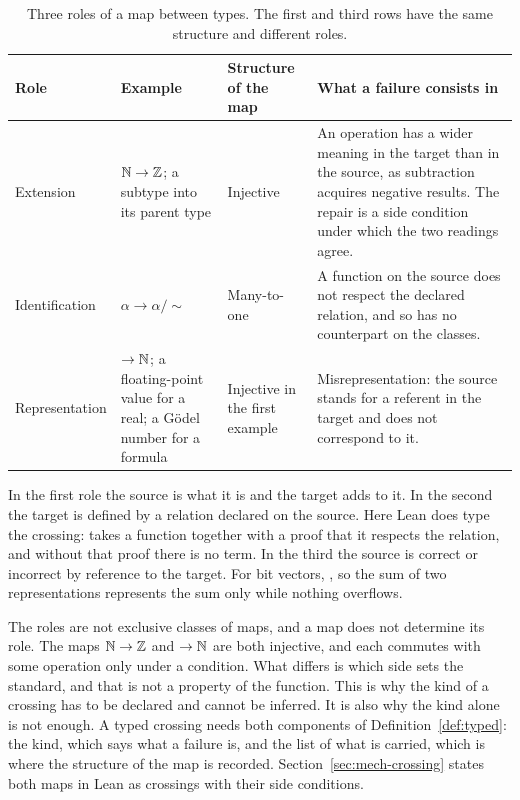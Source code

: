 \begin{table}[t]
\centering\small
\begin{tabularx}{\textwidth}{@{}P{2.3cm}P{3.2cm}P{3.0cm}L@{}}
\toprule
Role & Example & Structure of the map & What a failure consists in \\
\midrule
Extension &
  $\mathbb{N} \to \mathbb{Z}$; a subtype into its parent type &
  Injective &
  An operation has a wider meaning in the target than in the source, as subtraction
  acquires negative results. The repair is a side condition under which the two
  readings agree. \\
Identification &
  $\alpha \to \alpha/{\sim}$ &
  Many-to-one &
  A function on the source does not respect the declared relation, and so has no
  counterpart on the classes. \\
Representation &
   $\to \mathbb{N}$; a floating-point value for a real; a G\"odel number for a
  formula &
  Injective in the first example &
  Misrepresentation: the source stands for a referent in the target and does not
  correspond to it. \\
\bottomrule
\end{tabularx}
\caption{Three roles of a map between types. The first and third rows have the same
structure and different roles.}
\label{tab:roles}
\end{table}

In the first role the source is what it is and the target adds to it. In the second the
target is defined by a relation declared on the source. Here Lean does type the
crossing:  takes a function together with a proof that it respects
the relation, and without that proof there is no term. In the third the source is
correct or incorrect by reference to the target. For bit vectors,
, so the sum of two representations
represents the sum only while nothing overflows.

The roles are not exclusive classes of maps, and a map does not determine its role. The
maps $\mathbb{N} \to \mathbb{Z}$ and  $\to \mathbb{N}$ are both injective, and each commutes
with some operation only under a condition. What differs is which side sets the
standard, and that is not a property of the function. This is why the kind of a
crossing has to be declared and cannot be inferred. It is also why the kind alone is not
enough. A typed crossing needs both components of Definition~\ref{def:typed}: the kind,
which says what a failure is, and the list of what is carried, which is where the
structure of the map is recorded. Section~\ref{sec:mech-crossing} states both maps in
Lean as crossings with their side conditions.

